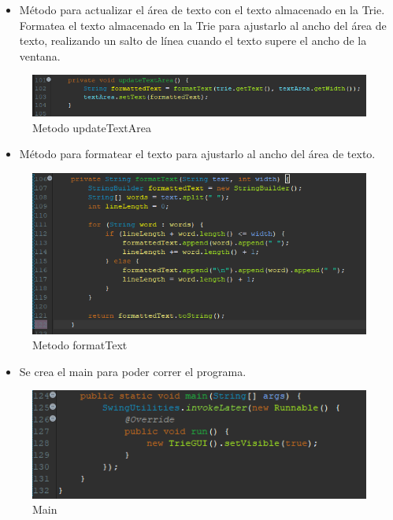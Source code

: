 \documentclass{article}
\begin{document}
          \begin{itemize}
              \item Método para actualizar el área de texto con el texto almacenado en la Trie. Formatea el texto almacenado en la Trie para ajustarlo al ancho del área de texto, realizando un salto de línea cuando el texto supere el ancho de la ventana.
          \end{itemize}
          \begin{figure}[H]
              \centering
              \includegraphics{img/img6.png}
              \caption{Metodo updateTextArea}
              \label{fig:enter-label}
          \end{figure}
          \clearpage
          \begin{itemize}
              \item Método para formatear el texto para ajustarlo al ancho del área de texto.
          \end{itemize}
          \begin{figure}[H]
              \centering
              \includegraphics{img/img7.png}
              \caption{Metodo formatText}
              \label{fig:enter-label}
          \end{figure}
          \begin{itemize}
              \item Se crea el main para poder correr el programa.
          \end{itemize}
	 \begin{figure}[H]
	     \centering
	     \includegraphics{img/img8.png}
	     \caption{Main}
	     \label{fig:enter-label}
	 \end{figure}
  \clearpage
\end{document}

